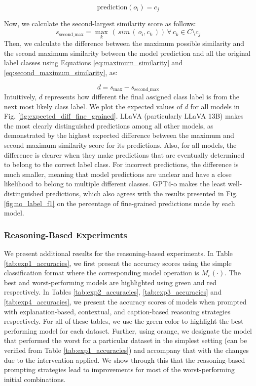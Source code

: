 \begin{equation}
\label{eq:prediction}
    \text{prediction}(o_i) = c_j
\end{equation}

Now, we calculate the second-largest similarity score as follows: 
\begin{equation}
\label{eq:second_maximum_similarity}
    s_{\text{second\_max}} = \max_{k}\, (\,sim\,(\,o_i, c_k\,))\, \forall\, c_k \in C \setminus c_j
\end{equation}
Then, we calculate the difference between the maximum possible similarity and the second maximum similarity between the model prediction and all the original label classes using Equations \ref{eq:maximum_similarity} and \ref{eq:second_maximum_similarity}, as: 

\begin{equation}
    {d} = s_{\text{max}} - s_{\text{second\_max}}
\end{equation}
Intuitively, \(d\) represents how different the final assigned class label is from the next most likely class label. We plot the expected values of \(d\) for all models in Fig. \ref{fig:expected_diff_fine_grained}. LLaVA (particularly LLaVA 13B) makes the most clearly distinguished predictions among all other models, as demonstrated by the highest expected difference between the maximum and second maximum similarity score for its predictions. Also, for all models, the difference is clearer when they make predictions that are eventually determined to belong to the correct label class. For incorrect predictions, the difference is much smaller, meaning that model predictions are unclear and have a close likelihood to belong to multiple different classes. GPT4-o makes the least well-distinguished predictions, which also agrees with the results presented in Fig. \ref{fig:no_label_f1} on the percentage of fine-grained predictions made by each model.


\subsubsection{Reasoning-Based Experiments}

We present additional results for the reasoning-based experiments. In Table \ref{tab:exp1_accuracies}, we first present the accuracy scores using the simple classification format where the corresponding model operation is \(M_{\text{c}}(\cdot)\). The best and worst-performing models are highlighted using green and red respectively. In Tables \ref{tab:exp2_accuracies}, \ref{tab:exp3_accuracies} and \ref{tab:exp4_accuracies}, we present the accuracy scores of models when prompted with explanation-based, contextual, and caption-based reasoning strategies respectively. For all of these tables, we use the green color to highlight the best-performing model for each dataset. Further, using orange, we designate the model that performed the worst for a particular dataset in the simplest setting (can be verified from Table \ref{tab:exp1_accuracies}) and accompany that with the changes due to the intervention applied. We show through this that the reasoning-based prompting strategies lead to improvements for most of the worst-performing initial combinations. 


